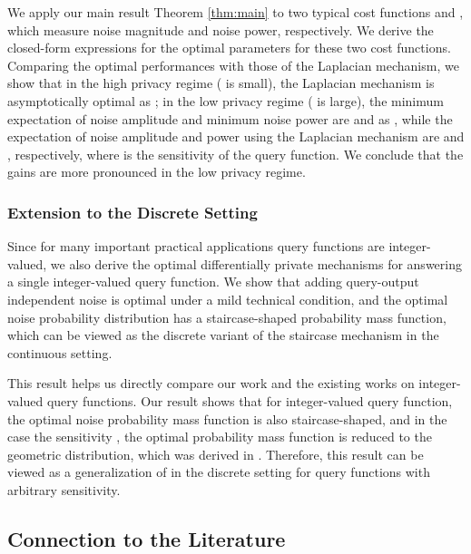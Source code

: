 We apply our main result Theorem \ref{thm:main} to two typical cost functions  and , which measure noise magnitude and noise power, respectively. We derive the closed-form expressions for the optimal parameters  for these two cost functions. Comparing the optimal performances with those of the Laplacian mechanism, we show that in the high privacy regime ( is small), the Laplacian mechanism is asymptotically optimal as ;  in the low privacy regime ( is large), the minimum expectation of noise amplitude  and minimum noise power are  and  as , while  the expectation of noise amplitude and power using the Laplacian mechanism are  and , respectively, where  is the sensitivity of the query function. We conclude that the gains are more pronounced in the low privacy regime.



\subsubsection{Extension to the Discrete Setting}

Since for many important practical applications query functions are integer-valued, we also derive the optimal differentially private mechanisms for answering a single integer-valued query function.
 We show that adding query-output independent noise is optimal under a mild technical condition, and the optimal noise probability distribution has a staircase-shaped probability mass function, which can be viewed as the discrete variant of the staircase mechanism in the continuous setting.

 This result helps us directly compare our work and the existing works \cite{Ghosh09, minimax10} on integer-valued query functions. Our result shows that for integer-valued query function, the optimal noise probability mass function is also  staircase-shaped, and in the case the sensitivity , the optimal probability mass function is reduced to the geometric distribution, which was derived in \cite{Ghosh09, minimax10}. Therefore, this result can be viewed as a generalization of \cite{Ghosh09, minimax10} in the discrete setting for query functions with arbitrary sensitivity.













\subsection{Connection to the Literature}\label{subsec:connection}

